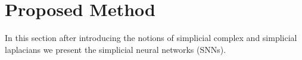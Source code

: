 \section{Proposed Method}
In this section after introducing the notions of simplicial complex and simplicial laplacians we present the simplicial neural networks (SNNs). 




